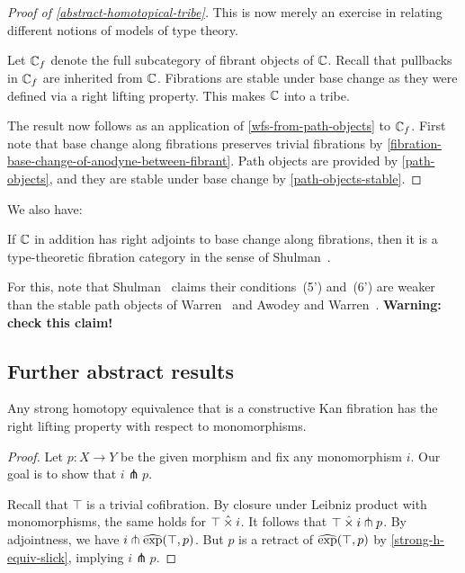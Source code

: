 \documentclass[reqno,10pt,a4paper,oneside]{amsart}
\begin{document}
\begin{proof}[Proof of \cref{abstract-homotopical-tribe}]
This is now merely an exercise in relating different notions of models of type theory.

Let $\mathbb{C}_f$ denote the full subcategory of fibrant objects of $\mathbb{C}$.
Recall that pullbacks in $\mathbb{C}_f$ are inherited from $\mathbb{C}$.
Fibrations are stable under base change as they were defined via a right lifting property.
This makes $\mathbb{C}$ into a tribe.

The result now follows as an application of \cref{wfs-from-path-objects} to $\mathbb{C}_f$.
First note that base change along fibrations preserves trivial fibrations by \cref{fibration-base-change-of-anodyne-between-fibrant}.
Path objects are provided by \cref{path-objects}, and they are stable under base change by \cref{path-objects-stable}.
\end{proof}

We also have:

\begin{theorem}
If $\mathbb{C}$ in addition has right adjoints to base change along fibrations, then it is a type-theoretic fibration category in the sense of Shulman~\cite{shulman:inverse-diagrams}.
\end{theorem}

For this, note that Shulman~\cite{shulman:inverse-diagrams} claims their conditions~(5') and~(6') are weaker than the stable path objects of Warren~\cite{warren:thesis} and Awodey and Warren~\cite{awodey-warren:homotopy-idtype}.
\textbf{Warning: check this claim!}

\subsection{Further abstract results}

\begin{lemma}
Any strong homotopy equivalence that is a constructive Kan fibration has the right lifting property with respect to monomorphisms.
\end{lemma}

\begin{proof}
\label{strong-h-equiv-kan-is-trivial}
Let $p : X \to Y$ be the given morphism and fix any monomorphism $i$.
Our goal is to show that $i \pitchfork p$.

Recall that $\top$ is a trivial cofibration.
By closure under Leibniz product with monomorphisms, the same holds for $\top \mathbin{\hat{\times}} i$.
It follows that $\top \mathbin{\hat{\times}} i \pitchfork p$.
By adjointness, we have $i \pitchfork \operatorname{\widehat{exp}}(\top, p)$.
But $p$ is a retract of $\operatorname{\widehat{exp}}(\top, p)$ by \cref{strong-h-equiv-slick}, implying $i \pitchfork p$.
\end{proof}
\end{document}
